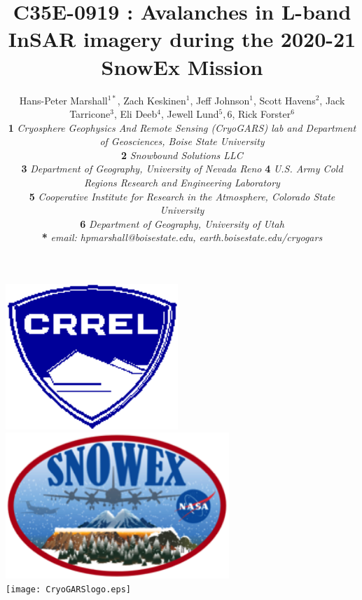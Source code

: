 \documentclass[landscape,a0b,final]{a0poster}
\title{C35E-0919 : Avalanches in L-band InSAR imagery during the 2020-21 SnowEx Mission}
\author{ \LARGE{Hans-Peter Marshall$^{1*}$, Zach Keskinen$^{1}$, Jeff Johnson$^{1}$, Scott Havens$^{2}$, Jack Tarricone$^3$, Eli Deeb$^4$, Jewell Lund$^5,6$, Rick Forster$^6$}\\ %
\textbf{1} \textit{Cryosphere Geophysics And Remote Sensing (CryoGARS) lab and Department of Geosciences, Boise State University} \\
\textbf{2} \textit{Snowbound Solutions LLC} \\
\textbf{3} \textit{Department of Geography, University of Nevada Reno}
\textbf{4} \textit{U.S. Army Cold Regions Research and Engineering Laboratory} \\
\textbf{5} \textit{Cooperative Institute for Research in the Atmosphere, Colorado State University} \\
\textbf{6} \textit{Department of Geography, University of Utah} \\
\textbf{*} \textit{email: hpmarshall@boisestate.edu, earth.boisestate.edu/cryogars}}
\begin{document}

\colorbox{boxcol}{		%
\begin{minipage}[c]{0.8525\textwidth}	%
\maketitle
\end{minipage}

\begin{minipage}[c]{0.15\textwidth}
\begin{flushright}
\includegraphics[height=5.5cm]{CRRELlogo.png} \hspace{0.2cm} %
\includegraphics[height=5.5cm]{SnowExLogo.png} \vspace{0.2cm} \\
\texttt{[image: CryoGARSlogo.eps]} \\

\end{flushright}
\end{minipage}

}
\vspace{1cm}
\end{document}
